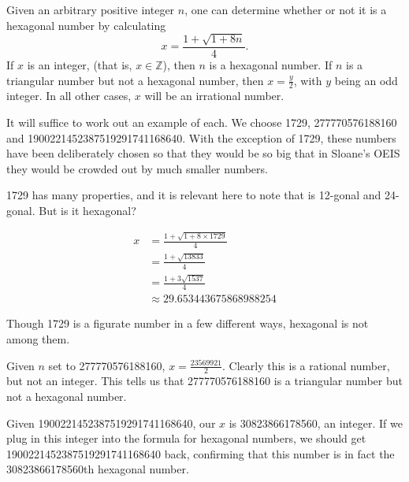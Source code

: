 \documentclass[12pt]{article}
\begin{document}
Given an arbitrary positive integer $n$, one can determine whether or not it is a hexagonal number by calculating $$x = \frac{1 + \sqrt{1 + 8n}}{4}.$$ If $x$ is an integer, (that is, $x \in \mathbb{Z}$), then  $n$ is a hexagonal number. If $n$ is a triangular number but not a hexagonal number, then $x = \frac{y}{2}$, with $y$ being an odd integer. In all other cases, $x$ will be an irrational number.

It will suffice to work out an example of each. We choose 1729, 277770576188160 and  1900221452387519291741168640. With the exception of 1729, these numbers have been deliberately chosen so that they would be so big that in Sloane's OEIS they would be crowded out by much smaller numbers.

1729 has many properties, and it is relevant here to note that is 12-gonal and 24-gonal. But is it hexagonal?

\begin{align*}
x & = \frac{1 + \sqrt{1 + 8 \times 1729}}{4} \\
& = \frac{1 + \sqrt{13833}}{4} \\
& = \frac{1 + 3 \sqrt{1537}}{4} \\
& \approx 29.653443675868988254
\end{align*}

Though 1729 is a figurate number in a few different ways, hexagonal is not among them.

Given $n$ set to 277770576188160, $x = \frac{23569921}{2}$. Clearly this is a rational number, but not an integer. This tells us that 277770576188160 is a triangular number but not a hexagonal number.

Given 1900221452387519291741168640, our $x$ is 30823866178560, an integer. If we plug in this integer into the formula for hexagonal numbers, we should get 1900221452387519291741168640 back, confirming that this number is in fact the 30823866178560th hexagonal number.
\end{document}
